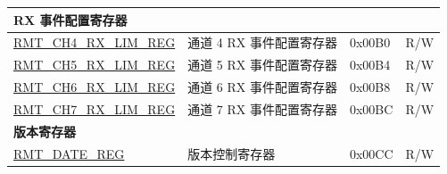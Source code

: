 \begin{longtable}{ | p{5.5cm} | p{6.5cm} | p{1.3cm} | p{1.8cm} | }
\multicolumn{4}{|l|}{\textbf{RX 事件配置寄存器}} \\ \hline
\hyperref[regdesc:RMTCHMRXLIMREG]{RMT\_CH4\_RX\_LIM\_REG} & 通道 4 RX 事件配置寄存器 & 0x00B0 & R/W \\ \hline
\hyperref[regdesc:RMTCHMRXLIMREG]{RMT\_CH5\_RX\_LIM\_REG} & 通道 5 RX 事件配置寄存器 & 0x00B4 & R/W \\ \hline
\hyperref[regdesc:RMTCHMRXLIMREG]{RMT\_CH6\_RX\_LIM\_REG} & 通道 6 RX 事件配置寄存器 & 0x00B8 & R/W \\ \hline
\hyperref[regdesc:RMTCHMRXLIMREG]{RMT\_CH7\_RX\_LIM\_REG} & 通道 7 RX 事件配置寄存器 & 0x00BC & R/W \\ \hline
\multicolumn{4}{|l|}{\textbf{版本寄存器}} \\ \hline
\hyperref[regdesc:RMTDATEREG]{RMT\_DATE\_REG} & 版本控制寄存器 & 0x00CC & R/W \\ \hline
\end{longtable}

